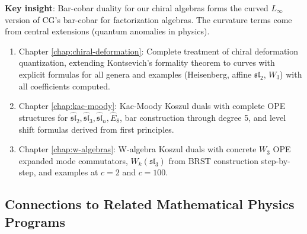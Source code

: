 \textbf{Key insight}: Bar-cobar duality for our chiral algebras forms the curved $L_\infty$ 
version of CG's bar-cobar for factorization algebras. The curvature terms come from 
central extensions (quantum anomalies in physics).

\begin{enumerate}
\item Chapter \ref{chap:chiral-deformation}: Complete treatment of chiral deformation quantization, extending Kontsevich's formality theorem to curves with explicit formulas for all genera and examples (Heisenberg, affine $\mathfrak{sl}_2$, $W_3$) with all coefficients computed.
\item Chapter \ref{chap:kac-moody}: Kac-Moody Koszul duals with complete OPE structures for $\widehat{\mathfrak{sl}}_2, \widehat{\mathfrak{sl}}_3, \widehat{\mathfrak{sl}}_n, \widehat{E}_8$, bar construction through degree 5, and level shift formulas derived from first principles.
\item Chapter \ref{chap:w-algebras}: W-algebra Koszul duals with concrete $W_3$ OPE expanded mode commutators, $W_k(\mathfrak{sl}_3)$ from BRST construction step-by-step, and examples at $c=2$ and $c=100$.
\end{enumerate}

\subsection{Connections to Related Mathematical Physics Programs}
\label{subsec:related-programs}

